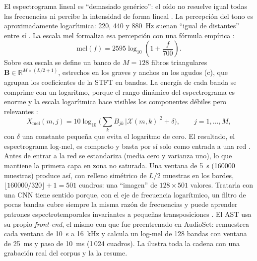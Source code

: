 El espectrograma lineal es ``demasiado genérico'': el oído no resuelve igual
todas las frecuencias ni percibe la intensidad de forma lineal
\citep[pp.~21, 76]{virtanen2018casse}. La percepción del tono es
aproximadamente logarítmica: 220, 440 y \SI{880}{\hertz} suenan ``igual de
distantes'' entre sí \citep[p.~22]{muller2021fmp}. La escala mel formaliza
esa percepción con una fórmula empírica \citep{oshaughnessy1987speech}:
\begin{equation}
  \mathrm{mel}(f) = 2595 \log_{10}\!\left(1 + \frac{f}{700}\right).
  \label{eq:mel}
\end{equation}
Sobre esa escala se define un banco de $M = 128$ filtros triangulares
$\mathbf{B} \in \mathbb{R}^{M \times (L/2+1)}$, estrechos en los graves y anchos
en los agudos (c), que agrupan los
coeficientes de la STFT en bandas. La energía de cada banda se comprime con
un logaritmo, porque el rango dinámico del espectrograma es enorme y la
escala logarítmica hace visibles los componentes débiles pero relevantes
\citep[pp.~56, 99]{muller2021fmp}:
\begin{equation}
  X_{\mathrm{mel}}(m, j) = 10 \log_{10}\!\Big(\sum_{k} B_{jk}\, |\mathcal{X}(m, k)|^2 + \delta\Big),
  \qquad j = 1, \dots, M,
  \label{eq:logmel}
\end{equation}
con $\delta$ una constante pequeña que evita el logaritmo de cero. El
resultado, el espectrograma log-mel, es compacto y basta por sí solo como
entrada a una red \citep[p.~81]{virtanen2018casse}. Antes de entrar a la
red se estandariza (media cero y varianza uno), lo que mantiene la primera
capa en zona no saturada. Una ventana de
\SI{5}{\second} (\num{160000} muestras) produce así, con relleno simétrico
de $L/2$ muestras en los bordes, $\lfloor 160000/320 \rfloor + 1 = 501$
cuadros: una ``imagen'' de $128 \times 501$ valores.
Tratarla con una CNN tiene sentido porque, con el eje de frecuencia
logarítmico, un filtro de pocas bandas cubre siempre la misma razón de
frecuencias y puede aprender patrones espectrotemporales invariantes a
pequeñas transposiciones \citep[p.~132]{virtanen2018casse}. El AST usa
su propio \textit{front-end}, el mismo con que fue preentrenado en AudioSet:
remuestrea cada ventana de \SI{10}{\second} a \SI{16}{\kilo\hertz} y
calcula un log-mel de 128 bandas con ventana de \SI{25}{\milli\second} y
paso de \SI{10}{\milli\second} (1\,024 cuadros). La
 ilustra toda la cadena con una grabación
real del corpus y la  la resume.

